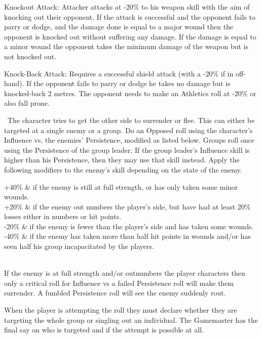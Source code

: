 \begin{description}
\begin{rpg-list}
		\item Knockout Attack: Attacker attacks at -20\% to his weapon skill with the aim of knocking out their opponent. If the attack is successful and the opponent fails to parry or dodge, and the damage done is equal to a major wound then the opponent is knocked out without suffering any damage. If the damage is equal to a minor wound the opponent takes the minimum damage of the weapon but is not knocked out.
		\item Knock-Back Attack: Requires a successful shield attack (with a -20\% if in off-hand). If the opponent fails to parry or dodge he takes no damage but is knocked-back 2 metres. The opponent needs to make an Athletics roll at -20\% or also fall prone.
		\end{rpg-list}
	\item[Intimidate/Persuade:]  The character tries to get the other side to surrender or flee. This can either be targeted at a single enemy or a group.  Do an Opposed roll using the character’s Influence vs. the enemies’ Persistence, modified as listed below. Groups roll once using the Persistence of the group leader. If the group leader’s Influence skill is higher than his Persistence, then they may use that skill instead. Apply the following modifiers to the enemy’s skill depending on the state of the enemy.
	\begin{rpg-table}[|c|X|]
		\hline
		+40\% & if the enemy is still at full strength, or has only taken some minor wounds.\\
		+20\% & if the enemy out numbers the player’s side, but have had at least 20\% losses either in numbers or hit points.\\
		-20\% & if the enemy is fewer than the player’s side and has taken some wounds.\\
		-40\% & if the enemy has taken more than half hit points in wounds and/or has seen half his group incapacitated by the players.\\
		\hline
		\\
		\hline
	\end{rpg-table}

If the enemy is at full strength and/or outnumbers the player characters then only a critical roll for Influence vs a failed Persistence roll will make them surrender. A fumbled Persistence roll will see the enemy suddenly rout.

When the player is attempting the roll they must declare whether they are targeting the whole group or singling out an individual. The Gamemaster has the final say on who is targeted and if the attempt is possible at all. 


\end{description}
